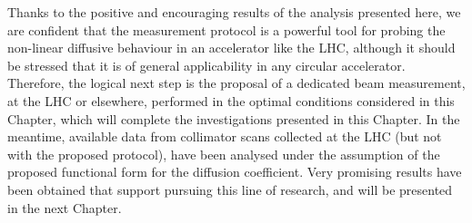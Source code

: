 Thanks to the positive and encouraging results of the analysis presented here, we are confident that the measurement protocol is a powerful tool for probing the non-linear diffusive behaviour in an accelerator like the LHC, although it should be stressed that it is of general applicability in any circular accelerator. Therefore, the logical next step is the proposal of a dedicated beam measurement, at the LHC or elsewhere, performed in the optimal conditions considered in this Chapter, which will complete the investigations presented in this Chapter. In the meantime, available data from collimator scans collected at the LHC (but not with the proposed protocol), have been analysed under the assumption of the proposed functional form for the diffusion coefficient. Very promising results have been obtained that support pursuing this line of research, and will be presented in the next Chapter.